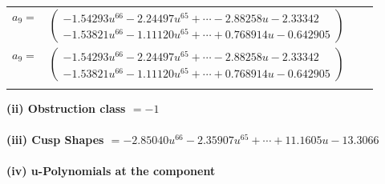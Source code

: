 \documentclass[1p]{elsarticle_modified}
\theoremstyle{definition}
\begin{document}
\begin{tabular}{m{7pt} m{180pt} m{7pt} m{180pt} }
\flushright $a_{9}=$&$\begin{pmatrix}-1.54293 u^{66}-2.24497 u^{65}+\cdots-2.88258 u-2.33342\\-1.53821 u^{66}-1.11120 u^{65}+\cdots+0.768914 u-0.642905\end{pmatrix}$\\ \flushright $a_{9}=$&$\begin{pmatrix}-1.54293 u^{66}-2.24497 u^{65}+\cdots-2.88258 u-2.33342\\-1.53821 u^{66}-1.11120 u^{65}+\cdots+0.768914 u-0.642905\end{pmatrix}$\\&\end{tabular}
\flushleft \textbf{(ii) Obstruction class $= -1$}\\~\\
\flushleft \textbf{(iii) Cusp Shapes $= -2.85040 u^{66}-2.35907 u^{65}+\cdots+11.1605 u-13.3066$}\\~\\
\newpage\renewcommand{\arraystretch}{1}
\flushleft \textbf{(iv) u-Polynomials at the component}\newline \\
\end{document}
